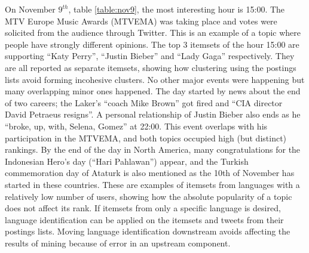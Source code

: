 \documentclass[letterpaper,12pt,titlepage,oneside,final]{book}
\begin{document}
On November $9^{th}$, table \ref{table:nov9}, the most interesting hour is
15:00.
The MTV Europe Music Awards (MTVEMA) was taking place and votes were solicited
from the audience through Twitter.
This is an example of a topic where people have strongly different opinions.
The top 3 itemsets of the hour 15:00 are supporting ``Katy  Perry'',
``Justin Bieber'' and ``Lady Gaga'' respectively.
They are all reported as separate itemsets, showing how clustering using the
postings lists avoid forming incohesive clusters.
No other major events were happening but many overlapping minor ones happened.
The day started by news about the end of two careers;
the Laker's ``coach Mike Brown'' got fired  and ``CIA director David Petraeus
resigns''.
A personal relationship of Justin Bieber also ends as he
``broke, up, with, Selena, Gomez'' at 22:00.
This event overlaps with his participation in the MTVEMA,
and both topics occupied high (but distinct) rankings. 
By the end of the day in North America, many congratulations for the
Indonesian Hero's day (``Hari Pahlawan'') appear, and the Turkish
commemoration day of Ataturk is also mentioned as the 10th of November has
started in these countries.
These are examples of itemsets from languages with a relatively low number of
users, showing how the absolute popularity of a topic does not affect its rank.
If itemsets from only a specific language is desired,
language identification can be applied on the itemsets and tweets from their
postings lists.
Moving language identification downstream avoids affecting the results of
mining because of error in an upstream component.
\end{document}
